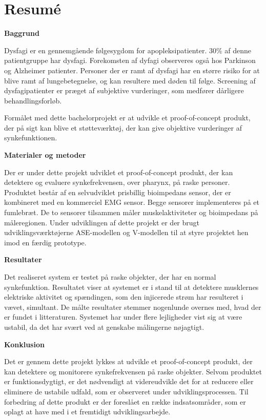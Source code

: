 \chapter{Resumé}

\textbf{Baggrund}

Dysfagi er en gennemgående følgesygdom for apopleksipatienter. 30\% af denne patientgruppe har dysfagi. Forekomsten af dyfagi observeres også hos Parkinson og Alzheimer patienter. Personer der er ramt af dysfagi har en større risiko for at blive ramt af lungebetegnelse, og kan resultere med døden til følge. Screening af dysfagipatienter er præget af subjektive vurderinger, som medfører dårligere behandlingsforløb. 

Formålet med dette bachelorprojekt er at udvikle et proof-of-concept produkt, der på sigt kan blive et støtteværktøj, der kan give objektive vurderinger af synkefunktionen. 

\textbf{Materialer og metoder }

Der er under dette projekt udviklet et proof-of-concept produkt, der kan detektere og evaluere synkefrekvensen, over pharynx, på raske personer. Produktet består af en selvudviklet prisbillig bioimpedans sensor, der er kombineret med en kommerciel EMG sensor. Begge sensorer implementeres på et fumlebræt. De to sensorer tilsammen måler muskelaktiviteter og bioimpedans på måleregionen. Under udviklingen af dette projekt er der brugt udviklingsværktøjerne ASE-modellen og V-modellen til at styre projektet hen imod en færdig prototype. 

\textbf{Resultater }

Det realiseret system er testet på raske objekter, der har en normal synkefunktion. Resultatet viser at systemet er i stand til at detektere musklernes elektriske aktivitet og spændingen, som den injicerede strøm har resulteret i vævet, simultant. De målte resultater stemmer nogenlunde overnes med, hvad der er fundet i litteraturen. Systemet har under flere lejligheder vist sig at være ustabil, da det har svært ved at genskabe målingerne nøjagtigt. 

\textbf{Konklusion}

Det er gennem dette projekt lykkes at udvikle et proof-of-concept produkt, der kan detektere og monitorere synkefrekvensen på raske objekter. Selvom produktet er funktionsdygtigt, er det nødvendigt at videreudvikle det for at reducere eller eliminere de ustabile udfald, som er observeret under udviklingsprocessen. Til forbedring af dette produkt er der foreslået en række indsatsområder, som er oplagt at have med i et fremtidigt udviklingsarbejde.



